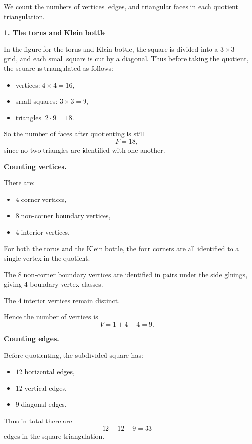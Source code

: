 \begin{solution}
We count the numbers of vertices, edges, and triangular faces in each quotient triangulation.

\par

\textbf{1. The torus and Klein bottle}

In the figure for the torus and Klein bottle, the square is divided into a \(3\times 3\) grid, and each small square is cut by a diagonal. Thus before taking the quotient, the square is triangulated as follows:

\begin{itemize}
	\item vertices: \(4\times 4=16\),
	\item small squares: \(3\times 3=9\),
	\item triangles: \(2\cdot 9=18\).
\end{itemize}

So the number of faces after quotienting is still
\[
F=18,
\]
since no two triangles are identified with one another.

\par

\textbf{Counting vertices.}

There are:
\begin{itemize}
	\item \(4\) corner vertices,
	\item \(8\) non-corner boundary vertices,
	\item \(4\) interior vertices.
\end{itemize}

For both the torus and the Klein bottle, the four corners are all identified to a single vertex in the quotient.

The \(8\) non-corner boundary vertices are identified in pairs under the side gluings, giving \(4\) boundary vertex classes.

The \(4\) interior vertices remain distinct.

Hence the number of vertices is
\[
V = 1 + 4 + 4 = 9.
\]

\par

\textbf{Counting edges.}

Before quotienting, the subdivided square has:
\begin{itemize}
	\item \(12\) horizontal edges,
	\item \(12\) vertical edges,
	\item \(9\) diagonal edges.
\end{itemize}
Thus in total there are
\[
12+12+9=33
\]
edges in the square triangulation.


\end{solution}
